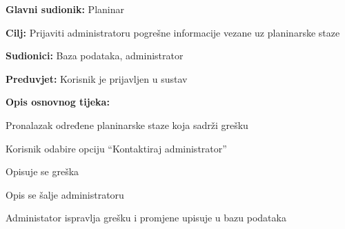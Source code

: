 		\noindent {}
		\begin{packed_item}
			
			\item \textbf{Glavni sudionik: }$ $Planinar$ $
			\item  \textbf{Cilj:} $ $Prijaviti administratoru pogrešne informacije vezane uz planinarske staze$ $
			\item  \textbf{Sudionici:} $ $Baza podataka, administrator $ $
			\item  \textbf{Preduvjet:} $ $Korisnik je prijavljen u sustav $ $
			\item  \textbf{Opis osnovnog tijeka:}
			
			\item[] \begin{packed_enum}
				
				\item $ $Pronalazak određene planinarske staze koja sadrži grešku $ $
				\item $ $Korisnik odabire opciju “Kontaktiraj administrator”$ $
				\item $ $Opisuje se greška 
				\item $ $Opis se šalje administratoru $ $
				\item $ $Administator ispravlja grešku i promjene upisuje u bazu podataka $ $
				
			\end{packed_enum}
		\end{packed_item}
	
